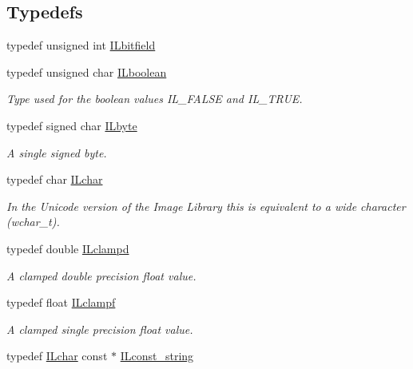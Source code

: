 \subsection*{Typedefs}
\begin{DoxyCompactItemize}
\item 
typedef unsigned int \hyperlink{group__il__types_gae47e67f5430ba6989eaaf6b9a3bc8e87}{I\+Lbitfield}
\item 
\hypertarget{group__il__types_gaa6aa7c95cfdc06b4d8601ef832b7bb0a}{typedef unsigned char \hyperlink{group__il__types_gaa6aa7c95cfdc06b4d8601ef832b7bb0a}{I\+Lboolean}}\label{group__il__types_gaa6aa7c95cfdc06b4d8601ef832b7bb0a}

\begin{DoxyCompactList}\small\item\em Type used for the boolean values {\itshape I\+L\+\_\+\+F\+A\+L\+S\+E} and {\itshape I\+L\+\_\+\+T\+R\+U\+E}. \end{DoxyCompactList}\item 
\hypertarget{group__il__types_gae50de507653746ec058ac59a453456b6}{typedef signed char \hyperlink{group__il__types_gae50de507653746ec058ac59a453456b6}{I\+Lbyte}}\label{group__il__types_gae50de507653746ec058ac59a453456b6}

\begin{DoxyCompactList}\small\item\em A single signed byte. \end{DoxyCompactList}\item 
typedef char \hyperlink{group__il__types_gabb6e047662a2e8131c5bcd785c84ff02}{I\+Lchar}
\begin{DoxyCompactList}\small\item\em In the Unicode version of the Image Library this is equivalent to a wide character ({\itshape wchar\+\_\+t}). \end{DoxyCompactList}\item 
typedef double \hyperlink{group__il__types_ga2cf462921bb7bef1badc94d63f3dbd4d}{I\+Lclampd}
\begin{DoxyCompactList}\small\item\em A clamped double precision float value. \end{DoxyCompactList}\item 
typedef float \hyperlink{group__il__types_gae90d8075bf3ef2cd89c09b26fd4dbef2}{I\+Lclampf}
\begin{DoxyCompactList}\small\item\em A clamped single precision float value. \end{DoxyCompactList}\item 
\hypertarget{group__il__types_ga1aa1edc3eb344e14acacb02bade24a5a}{typedef \hyperlink{group__il__types_gabb6e047662a2e8131c5bcd785c84ff02}{I\+Lchar} const $\ast$ \hyperlink{group__il__types_ga1aa1edc3eb344e14acacb02bade24a5a}{I\+Lconst\+\_\+string}}\label{group__il__types_ga1aa1edc3eb344e14acacb02bade24a5a}


\end{DoxyCompactItemize}
